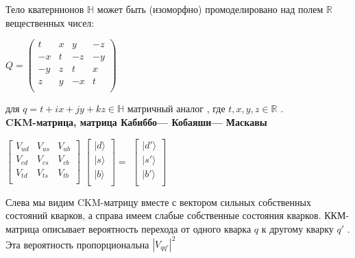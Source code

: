 \documentclass[12pt,a4paper]{article}
\begin{document}
\par Тело кватернионов $\mathbb{H}$ может быть (изоморфно) промоделировано над полем $\mathbb{R}$ вещественных чисел:

\begin{flushright}$
Q=
\left(\begin{matrix}
t & x & y & -z \\
-x & t & -z & -y \\
-y & z & t & x \\
z & y & -x & t \\
\end{matrix}\right)
$\end{flushright}

для $q=t+ix+jy+kz \in \mathbb{H}$  матричный аналог  , где $t,x,y,z \in \mathbb{R}$ .\\

\textbf{CKM-матрица, матрица Кабиббо— Кобаяши— Маскавы}
\\
\par\qquad
$ 
\begin{bmatrix}
V_{ud} & V_{us} & V_{ub} \\
V_{cd} & V_{cs} & V_{cb} \\
V_{td} & V_{ts} & V_{tb} \\
\end{bmatrix}
$
$
\begin{bmatrix}
|d\rangle \\
|s\rangle \\
|b\rangle \\
\end{bmatrix} = 
$
$
\begin{bmatrix}
|d'\rangle \\
|s'\rangle \\
|b'\rangle \\
\end{bmatrix} 
$
\\
\par Слева мы видим CKM-матрицу вместе с вектором сильных собственных состояний кварков, а справа имеем слабые собственные состояния кварков. ККМ-матрица описывает вероятность перехода от одного кварка $q$ к другому кварку $q'$ . Эта вероятность пропорциональна  $|V_{qq'}|^2$
\end{document}
